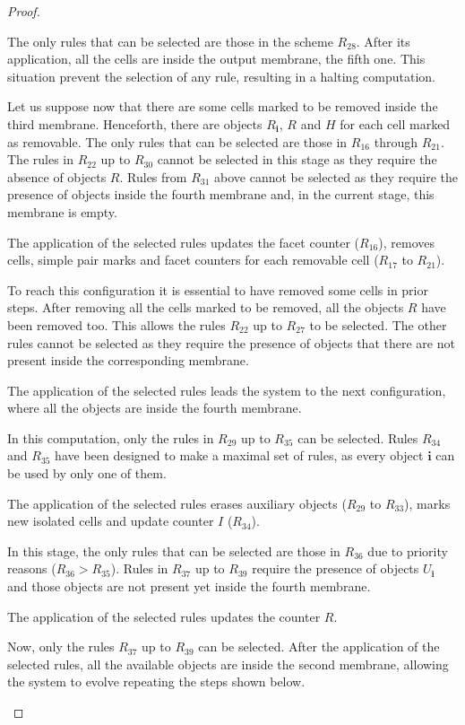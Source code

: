 \documentclass[journal]{IEEEtran}
\begin{document}
\begin{proof}
\begin{list}{\textbf{Step }}{}
\begin{list}{)}{}
The only rules that can be selected are those in the scheme $R_{28}$. After its
application, all the cells are inside the output membrane, the fifth one. This
situation prevent the selection of any rule, resulting in a halting computation.
\item Let us suppose now that there are some cells marked to be removed inside the third
membrane. Henceforth, there are objects $R_\mathbf{i}$, $R$ and $H$ for each
cell marked as removable. The only rules that can be selected are those in
$R_{16}$ through $R_{21}$. The rules in $R_{22}$ up to $R_{30}$ cannot be
selected in this stage as they require the absence of objects $R$. Rules from
$R_{31}$ above cannot be selected as they require the presence of objects
inside the fourth membrane and, in the current stage, this membrane is empty.

The application of the selected rules updates the facet counter
($R_{16}$), removes cells, simple pair marks and facet counters for
each removable cell ($R_{17}$ to $R_{21}$).
\end{list}
\item To reach this configuration it is essential to have removed some cells in
prior steps. After removing all the cells marked to be removed, all the objects
$R$ have been removed too. This allows the rules $R_{22}$ up to $R_{27}$ to be
selected. The other rules cannot be selected as they require the presence of
objects that there are not present inside the corresponding membrane.

The application of the selected rules leads the system to the next
configuration, where all the objects are inside the fourth membrane.
\item In this computation, only the rules in $R_{29}$ up to $R_{35}$ can be
selected. Rules $R_{34}$ and $R_{35}$ have been designed to make a maximal set
of rules, as every object $\mathbf{i}$ can be used by only one of them.

The application of the selected rules erases auxiliary objects ($R_{29}$ to
$R_{33}$), marks new isolated cells and update counter $I$ ($R_{34}$).
\item In this stage, the only rules that can be selected are those in $R_{36}$
due to priority reasons ($R_{36} > R_{35}$). Rules in $R_{37}$ up to $R_{39}$
require the presence of objects $U_\mathbf{i}$ and those objects are not
present yet inside the fourth membrane.

The application of the selected rules updates the counter $R$.
\item Now, only the rules $R_{37}$ up to $R_{39}$ can be
selected. After the application of the selected rules, all the available objects
are inside the second membrane, allowing the system to evolve repeating the
steps shown below.
\end{list}

\end{proof}
\end{document}
